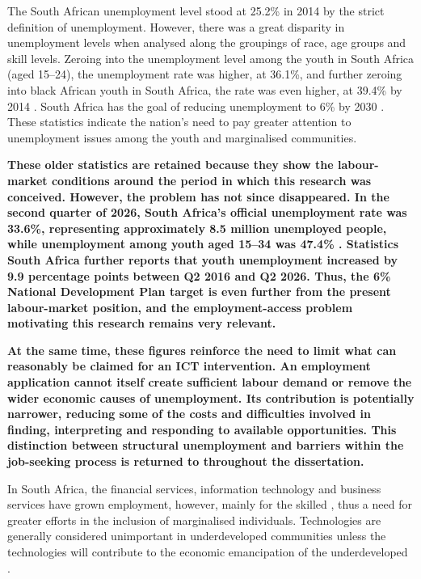 The South African unemployment level stood at 25.2\% in 2014 by the strict definition of unemployment. However, there was a great disparity in unemployment levels when analysed along the groupings of race, age groups and skill levels. Zeroing into the unemployment level among the youth in South Africa (aged 15–24), the unemployment rate was higher, at 36.1\%, and further zeroing into black African youth in South Africa, the rate was even higher, at 39.4\% by 2014 \cite{statssa2015}. South Africa has the goal of reducing unemployment to 6\% by 2030 \cite{npc2012}. These statistics indicate the nation’s need to pay greater attention to unemployment issues among the youth and marginalised communities.

\textbf{These older statistics are retained because they show the labour-market conditions around the period in which this research was conceived. However, the problem has not since disappeared. In the second quarter of 2026, South Africa's official unemployment rate was 33.6\%, representing approximately 8.5 million unemployed people, while unemployment among youth aged 15–34 was 47.4\% \cite{statssa2026}. Statistics South Africa further reports that youth unemployment increased by 9.9 percentage points between Q2 2016 and Q2 2026. Thus, the 6\% National Development Plan target is even further from the present labour-market position, and the employment-access problem motivating this research remains very relevant.}

\textbf{At the same time, these figures reinforce the need to limit what can reasonably be claimed for an ICT intervention. An employment application cannot itself create sufficient labour demand or remove the wider economic causes of unemployment. Its contribution is potentially narrower, reducing some of the costs and difficulties involved in finding, interpreting and responding to available opportunities. This distinction between structural unemployment and barriers within the job-seeking process is returned to throughout the dissertation.}

In South Africa, the financial services, information technology and business services have grown employment, however, mainly for the skilled \cite{npc2012}, thus a need for greater efforts in the inclusion of marginalised individuals. Technologies are generally considered unimportant in underdeveloped communities unless the technologies will contribute to the economic emancipation of the underdeveloped \cite{lorini2014}.


